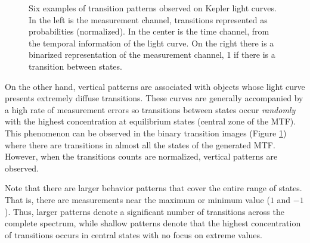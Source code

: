\begin{figure}[t!]
    \centering
    \qquad
    \caption{Six examples of transition patterns observed on Kepler light curves. In the left is the measurement channel, transitions represented as probabilities (normalized). In the center is the time channel, from the temporal information of the light curve. On the right there is a binarized representation of the measurement channel, 1 if there is a transition between states.}%
    \label{fig:mtf_ex}
\end{figure}
On the other hand, vertical patterns are associated with objects whose light curve presents extremely diffuse transitions. These curves are generally accompanied by a high rate of measurement errors so transitions between states occur \textit{randomly} with the highest concentration at equilibrium states (central zone of the MTF). This phenomenon can be observed in the binary transition images (Figure \ref{fig:mtf_ex}) where there are transitions in almost all the states of the generated MTF. However, when the transitions counts are normalized, vertical patterns are observed.

Note that there are larger behavior patterns that cover the entire range of states. That is, there are measurements near the maximum or minimum value ($1 $ and $- 1$). 
Thus, larger patterns denote a significant number of transitions across the complete spectrum, while shallow patterns denote that the highest concentration of transitions occurs in central states with no focus on extreme values.


